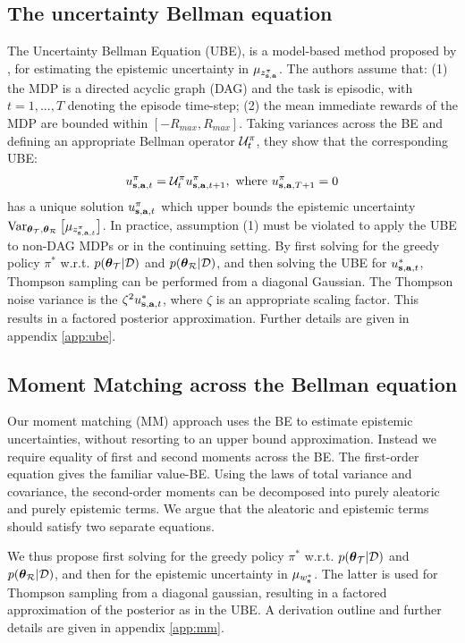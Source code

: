 \documentclass{article}
\begin{document}
\subsection{The uncertainty Bellman equation}
The Uncertainty Bellman Equation (UBE), is a model-based method proposed by \cite{ube}, for estimating the epistemic uncertainty in $\mu_{z^\pi_{\mathbf{s}, \mathbf{a}}}$. The authors assume that: (1) the MDP is a directed acyclic graph (DAG) and the task is episodic, with $t = 1, ..., T$ denoting the episode time-step; (2) the mean immediate rewards of the MDP are bounded within $[-R_{max}, R_{max}]$. Taking variances across the BE and defining an appropriate Bellman operator $\mathcal{U}^\pi_t$, they show that the corresponding UBE:
\begin{gather*}
u_{\mathbf{s}, \mathbf{a}, t}^\pi = \mathcal{U}^\pi_{t} u_{\mathbf{s}, \mathbf{a}, t + 1}^\pi,\text{ where } u_{\mathbf{s}, \mathbf{a}, T + 1}^\pi = 0
\end{gather*}
has a unique solution $u_{\mathbf{s}, \mathbf{a}, t}^\pi$ which upper bounds the epistemic uncertainty $\operatorname{\text{Var}}_{\boldsymbol{\theta}_{\mathcal{T}}, \boldsymbol{\theta}_{\mathcal{R}}} \big[ \mu_{z^{\pi}_{\mathbf{s}, \mathbf{a}, t}} \big]$. In practice, assumption (1) must be violated to apply the UBE to non-DAG MDPs or in the continuing setting. By first solving for the greedy policy ${\pi^*}$ w.r.t. $p(\boldsymbol{\theta}_{\mathcal{T}} | \mathcal{D})$ and $p(\boldsymbol{\theta}_{\mathcal{R}} | \mathcal{D})$, and then solving the UBE for $u_{\mathbf{s}, \mathbf{a}, t}^{*}$, Thompson sampling can be performed from a diagonal Gaussian. The Thompson noise variance is the $\zeta^2 u_{\mathbf{s}, \mathbf{a}, t}^{*}$, where $\zeta$ is an appropriate scaling factor. This results in a factored posterior approximation. Further details are given in appendix \ref{app:ube}.

\subsection{Moment Matching across the Bellman equation}

Our moment matching (MM) approach uses the BE to estimate epistemic uncertainties, without resorting to an upper bound approximation. Instead we require equality of first and second moments across the BE. The first-order equation gives the familiar value-BE. Using the laws of total variance and covariance, the second-order moments can be decomposed into purely aleatoric and purely epistemic terms. We argue that the aleatoric and epistemic terms should satisfy two separate equations.

We thus propose first solving for the greedy policy $\pi^*$ w.r.t. $p(\boldsymbol{\theta}_{\mathcal{T}} | \mathcal{D})$ and $p(\boldsymbol{\theta}_{\mathcal{R}} | \mathcal{D})$, and then for the epistemic uncertainty in $\mu_{w^*_{\mathbf{s}}}$. The latter is used for Thompson sampling from a diagonal gaussian, resulting in a factored approximation of the posterior as in the UBE. A derivation outline and further details are given in appendix \ref{app:mm}.
\end{document}
